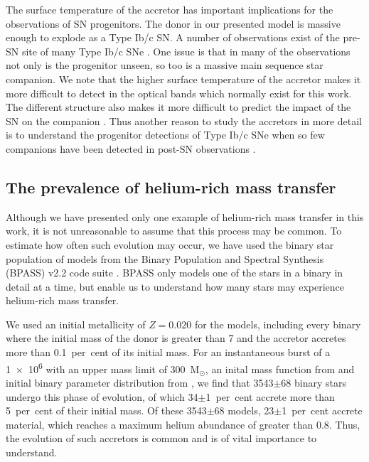 The surface temperature of the accretor has important implications for the observations of SN progenitors. The donor in our presented model is massive enough to explode as a Type Ib/c SN. A number of observations exist of the pre-SN site of many Type Ib/c SNe \citep{Eldridge:2013, Eldridge:2016}. One issue is that in many of the observations not only is the progenitor unseen, so too is a massive main sequence star companion. We note that the higher surface temperature of the accretor makes it more difficult to detect in the optical bands which normally exist for this work. The different structure also makes it more difficult to predict the impact of the SN on the companion \citep{Hirai:2018}. Thus another reason to study the accretors in more detail is to understand the progenitor detections of Type Ib/c SNe when so few companions have been detected in post-SN observations \citep{Eldridge:2016}.

\subsection{The prevalence of helium-rich mass transfer}\label{sec:the_prevalence_of_helium_rich_mass_transfer}

Although we have presented only one example of helium-rich mass transfer in this work, it is not unreasonable to assume that this process may be common. To estimate how often such evolution may occur, we have used the binary star population of models from the Binary Population and Spectral Synthesis (BPASS) v2.2 code suite \citep{Eldridge:2017, Stanway:2018}. BPASS only models one of the stars in a binary in detail at a time, but enable us to understand how many stars may experience helium-rich mass transfer.

We used an initial metallicity of $Z=0.020$ for the models, including every binary where the initial mass of the donor is greater than \SI{7}{\msun} and the accretor accretes more than 0.1~per~cent of its initial mass. For an instantaneous burst of a \SI[print-unity-mantissa=false]{1e6}{\msun} with an upper mass limit of 300~M$_{\odot}$, an inital mass function from \citet{Kroupa:2001} and initial binary parameter distribution from \citet{Moe:2017}, we find that 3543$\pm$68 binary stars undergo this phase of evolution, of which 34$\pm$1~per~cent accrete more than 5~per~cent of their initial mass. Of these 3543$\pm$68 models, 23$\pm$1~per~cent accrete material, which reaches a maximum helium abundance of greater than 0.8. Thus, the evolution of such accretors is common and is of vital importance to understand.

